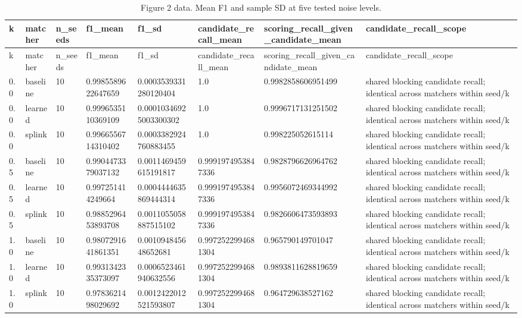 \begin{longtable}{llllllll}
\caption{Figure 2 data. Mean F1 and sample SD at five tested noise levels.}\\
\toprule
k & matcher & n\_seeds & f1\_mean & f1\_sd & candidate\_recall\_mean & scoring\_recall\_given\_candidate\_mean & candidate\_recall\_scope \\
\midrule
\endfirsthead
\toprule
k & matcher & n\_seeds & f1\_mean & f1\_sd & candidate\_recall\_mean & scoring\_recall\_given\_candidate\_mean & candidate\_recall\_scope \\
\midrule
\endhead
0.0 & baseline & 10 & 0.9985589622647659 & 0.0003539331280120404 & 1.0 & 0.9982858606951499 & shared blocking candidate recall; identical across matchers within seed/k \\
0.0 & learned & 10 & 0.9996535110369109 & 0.00010346925003300302 & 1.0 & 0.9996717131251502 & shared blocking candidate recall; identical across matchers within seed/k \\
0.0 & splink & 10 & 0.9966556714310402 & 0.0003382924760883455 & 1.0 & 0.998225052615114 & shared blocking candidate recall; identical across matchers within seed/k \\
0.5 & baseline & 10 & 0.9904473379037132 & 0.0011469459615191817 & 0.9991974953847336 & 0.9828796626964762 & shared blocking candidate recall; identical across matchers within seed/k \\
0.5 & learned & 10 & 0.997251414249664 & 0.0004444635869444314 & 0.9991974953847336 & 0.9956072469344992 & shared blocking candidate recall; identical across matchers within seed/k \\
0.5 & splink & 10 & 0.9885296453893708 & 0.0011055058887515102 & 0.9991974953847336 & 0.9826606473593893 & shared blocking candidate recall; identical across matchers within seed/k \\
1.0 & baseline & 10 & 0.9807291641861351 & 0.001094845648652681 & 0.9972522994681304 & 0.965790149701047 & shared blocking candidate recall; identical across matchers within seed/k \\
1.0 & learned & 10 & 0.9931342335373097 & 0.0006523461940632556 & 0.9972522994681304 & 0.9893811628819659 & shared blocking candidate recall; identical across matchers within seed/k \\
1.0 & splink & 10 & 0.9783621498029692 & 0.0012422012521593807 & 0.9972522994681304 & 0.964729638527162 & shared blocking candidate recall; identical across matchers within seed/k \\

\end{longtable}
